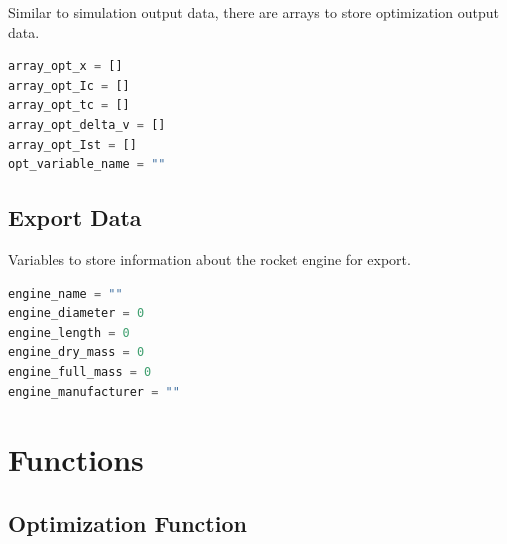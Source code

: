 \documentclass{report}
\begin{document}
Similar to simulation output data, there are arrays to store optimization output data.

\begin{lstlisting}[language=Python]
array_opt_x = []
array_opt_Ic = []
array_opt_tc = []
array_opt_delta_v = []
array_opt_Ist = []
opt_variable_name = ""
\end{lstlisting}

\section{Export Data}

Variables to store information about the rocket engine for export.

\begin{lstlisting}[language=Python]
engine_name = ""
engine_diameter = 0
engine_length = 0
engine_dry_mass = 0
engine_full_mass = 0
engine_manufacturer = ""
\end{lstlisting}

\chapter{Functions}

\section{Optimization Function}
\end{document}
